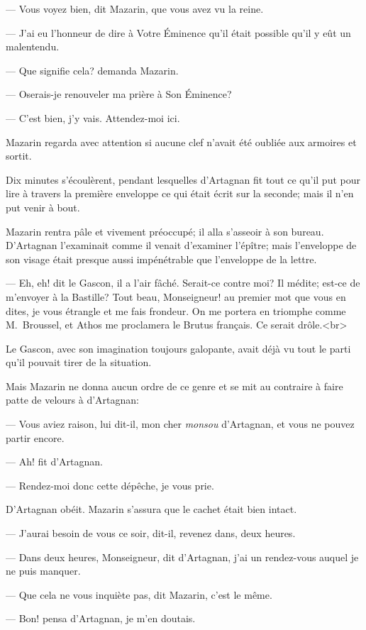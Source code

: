 — Vous voyez bien, dit Mazarin, que vous avez vu la reine.

— J'ai eu l'honneur de dire à Votre Éminence qu'il était possible qu'il y eût un malentendu.

— Que signifie cela? demanda Mazarin.

— Oserais-je renouveler ma prière à Son Éminence?

— C'est bien, j'y vais. Attendez-moi ici.

Mazarin regarda avec attention si aucune clef n'avait été oubliée aux armoires et sortit.

Dix minutes s'écoulèrent, pendant lesquelles d'Artagnan fit tout ce qu'il put pour lire à travers la première enveloppe ce qui était écrit sur la seconde; mais il n'en put venir à bout.

Mazarin rentra pâle et vivement préoccupé; il alla s'asseoir à son bureau. D'Artagnan l'examinait comme il venait d'examiner l'épître; mais l'enveloppe de son visage était presque aussi impénétrable que l'enveloppe de la lettre.

— Eh, eh! dit le Gascon, il a l'air fâché. Serait-ce contre moi? Il médite; est-ce de m'envoyer à la Bastille? Tout beau,
Monseigneur! au premier mot que vous en dites, je vous étrangle et me fais frondeur. On me portera en triomphe comme M.~Broussel, et
Athos me proclamera le Brutus français. Ce serait drôle.<br> 

Le Gascon, avec son imagination toujours galopante, avait déjà vu tout le parti qu'il pouvait tirer de la situation.

Mais Mazarin ne donna aucun ordre de ce genre et se mit au contraire à faire patte de velours à d'Artagnan:

— Vous aviez raison, lui dit-il, mon cher \textit{monsou} d'Artagnan, et vous ne pouvez partir encore.

— Ah! fit d'Artagnan.

— Rendez-moi donc cette dépêche, je vous prie.

D'Artagnan obéit. Mazarin s'assura que le cachet était bien intact.

— J'aurai besoin de vous ce soir, dit-il, revenez dans, deux heures.

— Dans deux heures, Monseigneur, dit d'Artagnan, j'ai un rendez-vous auquel je ne puis manquer.

— Que cela ne vous inquiète pas, dit Mazarin, c'est le même.

— Bon! pensa d'Artagnan, je m'en doutais.

